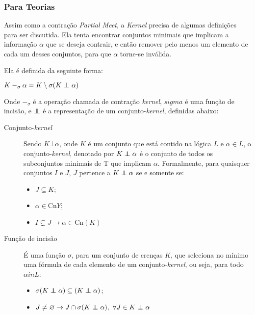 \subsubsection{Para Teorias}

Assim como a contração \textit{Partial Meet}, a \textit{Kernel} precisa de algumas definições para ser discutida. Ela tenta encontrar conjuntos minimais que implicam a informação $ \alpha $ que se deseja contrair, e então remover pelo menos um elemento de cada um desses conjuntos, para que $ \alpha $ torne-se inválida. 

Ela é definida da seguinte forma:

\begin{center}
	$ K -_{\sigma} \alpha = K \setminus \sigma(K \kcont \alpha) $
\end{center}

Onde $ -_{\sigma} $ é a operação chamada de contração \textit{kernel}, $ sigma $ é uma função de incisão, e $ \kcont $ é a representação de um conjunto-\textit{kernel}, definidas abaixo:

\begin{description}
	\item[Conjunto-\textit{kernel}] Sendo $ K \bot \alpha $, onde $ K $ é um conjunto que está contido na lógica $ L $ e $ \alpha \in L $, o conjunto-\textit{kernel}, denotado por $ K \kcont \alpha $ é o conjunto de todos os subconjuntos minimais de T que implicam $ \alpha $. Formalmente, para quaisquer conjuntos $ I $ e $ J $, $ J $ pertence a $ K \kcont \alpha $ se e somente se:
	\begin{itemize}
		\item $ J \subseteq K $;
		\item $ \alpha \in \text{Cn}Y $;
		\item $ I \subsetneq J \to \alpha \in \text{Cn}(K) $
	\end{itemize} 	
	\item[Função de incisão] É uma função $ \sigma $, para um conjunto de crenças $ K $, que seleciona no mínimo uma fórmula de cada elemento de um conjunto-\textit{kernel}, ou seja, para todo $ \alpha in L $:
	\begin{itemize}
		\item $ \sigma (K \kcont \alpha) \subseteq (K \kcont \alpha) $;
		\item $ J \neq \varnothing \to J \cap \sigma(K \kcont \alpha),\text{ } \forall J \in K \kcont \alpha $
	\end{itemize}
\end{description}


